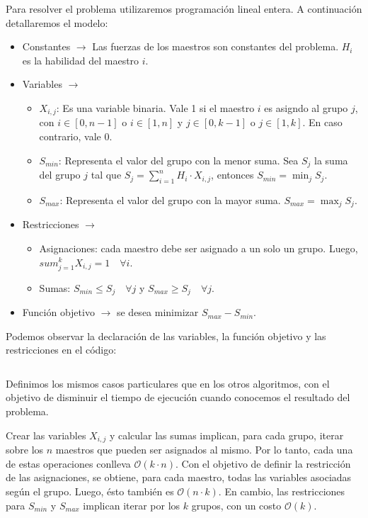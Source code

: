 \documentclass{article}
\begin{document}
Para resolver el problema utilizaremos programación lineal entera. A continuación detallaremos el modelo:
\begin{itemize}
    \item Constantes $\rightarrow$ Las fuerzas de los maestros son constantes del problema. $H_i$ es la habilidad del maestro $i$.
    \item Variables $\rightarrow$
    \begin{itemize}
        \item $X_{i,j}$: Es una variable binaria. Vale 1 si el maestro $i$ es asigndo al grupo $j$, con $i \in [0, n-1]$ o $i \in [1, n]$ y $ j \in [0, k-1]$ o $j \in [1, k]$. En caso contrario, vale 0.
        \item $S_{min}$: Representa el valor del grupo con la menor suma. Sea $S_j$ la suma del grupo $j$ tal que $S_j = \sum_{i=1}^{n} H_i \cdot X_{i,j} $, entonces $S_{min} = \min_j S_j$. 
        \item $S_{max}$: Representa el valor del grupo con la mayor suma. $S_{max} = \max_j S_j$.
    \end{itemize}
    \item Restricciones $\rightarrow$
    \begin{itemize}
        \item Asignaciones: cada maestro debe ser asignado a un solo un grupo. Luego, $sum_{j=1}^{k} X_{i,j} = 1 \quad \forall i$.
        \item Sumas: $S_{min} \leq S_j \quad \forall j$ y $S_{max} \geq S_j \quad \forall j$.
    \end{itemize}
    \item Función objetivo $\rightarrow$ se desea minimizar $S_{max} - S_{min}$.
\end{itemize}

Podemos observar la declaración de las variables, la función objetivo y las restricciones en el código:

\inputminted[linenos, firstline=4, lastline=66]{python}{codigo/programacion_lineal.py}

Definimos los mismos casos particulares que en los otros algoritmos, con el objetivo de disminuir el tiempo de ejecución cuando conocemos el resultado del problema.

Crear las variables $X_{i,j}$ y calcular las sumas implican, para cada grupo, iterar sobre los $n$ maestros que pueden ser asignados al mismo. Por lo tanto, cada una de estas operaciones conlleva $\mathcal{O}(k \cdot n)$. Con el objetivo de definir la restricción de las asignaciones, se obtiene, para cada maestro, todas las variables asociadas según el grupo. Luego, ésto también es $\mathcal{O}(n \cdot k)$. En cambio, las restricciones para $S_{min}$ y $S_{max}$ implican iterar por los $k$ grupos, con un costo $\mathcal{O}(k)$. 
\end{document}
